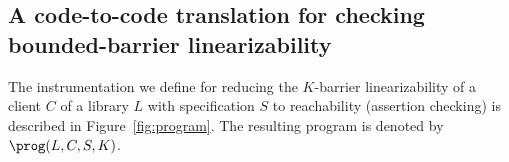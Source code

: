 \subsection{A code-to-code translation for checking bounded-barrier linearizability}

The instrumentation we define for reducing the $K$-barrier linearizability of a client $C$ of a library $L$ with 
specification $S$ to reachability (assertion checking) is described in Figure~\ref{fig:program}. 
The resulting program is denoted by $\prog(L,C,S,K)$.


